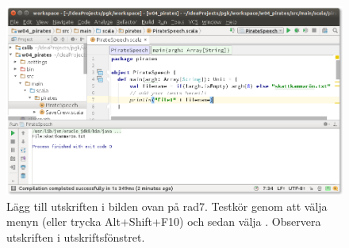 \begin{figure}
\centering
\includegraphics[width=1.0\textwidth]{../img/intellij/idea-import9-run.png} 
\caption{Lägg till utskriften i bilden ovan på rad7. Testkör genom att välja menyn  (eller trycka Alt+Shift+F10) och sedan välja . Observera utskriften i utskriftsfönstret.}
\label{fig:idea:import9-run}
\end{figure}




